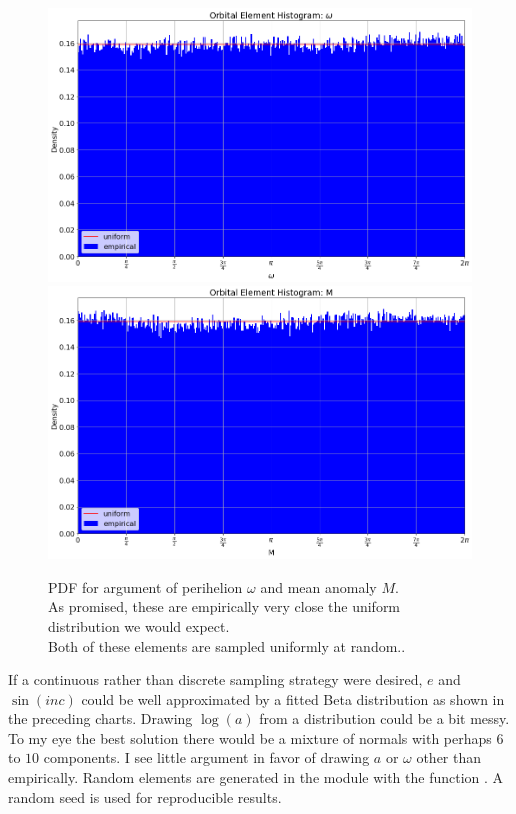 \begin{figure}[hbt!]
\begin{center}
\includegraphics[width=1.0\textwidth]{../figs/elts/elt_hist_omega_peri.png}
\includegraphics[width=1.0\textwidth]{../figs/elts/elt_hist_M.png}
\caption{PDF for argument of perihelion $\omega$ and mean anomaly $M$.\\ 
As promised, these are empirically very close the uniform distribution we would expect.\\
Both of these elements are sampled uniformly at random..}
\end{center}
\end{figure}
\clearpage

If a continuous rather than discrete sampling strategy were desired, $e$ and $\sin(inc)$ could be well approximated by 
a fitted Beta distribution as shown in the preceding charts.
Drawing $\log(a)$ from a distribution could be a bit messy.  
To my eye the best solution there would be a mixture of normals with perhaps $6$ to $10$ components.
I see little argument in favor of drawing $a$ or $\omega$ other than empirically.
Random elements are generated in the module  with the function .
A random seed is used for reproducible results.

